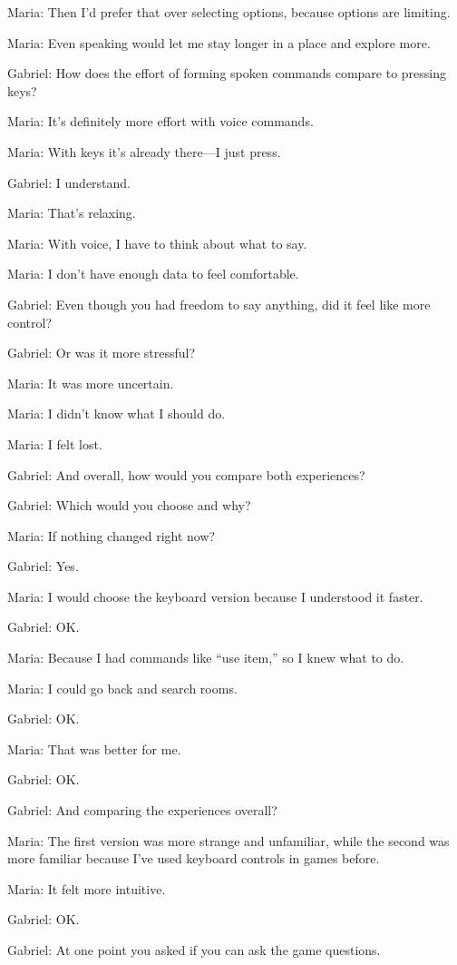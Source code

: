 Maria: Then I’d prefer that over selecting options, because options are limiting.

Maria: Even speaking would let me stay longer in a place and explore more.

Gabriel: How does the effort of forming spoken commands compare to pressing keys?

Maria: It’s definitely more effort with voice commands.

Maria: With keys it’s already there—I just press.

Gabriel: I understand.

Maria: That’s relaxing.

Maria: With voice, I have to think about what to say.

Maria: I don’t have enough data to feel comfortable.

Gabriel: Even though you had freedom to say anything, did it feel like more control?

Gabriel: Or was it more stressful?

Maria: It was more uncertain.

Maria: I didn’t know what I should do.

Maria: I felt lost.

Gabriel: And overall, how would you compare both experiences?

Gabriel: Which would you choose and why?

Maria: If nothing changed right now?

Gabriel: Yes.

Maria: I would choose the keyboard version because I understood it faster.

Gabriel: OK.

Maria: Because I had commands like “use item,” so I knew what to do.

Maria: I could go back and search rooms.

Gabriel: OK.

Maria: That was better for me.

Gabriel: OK.

Gabriel: And comparing the experiences overall?

Maria: The first version was more strange and unfamiliar, while the second was more familiar because I’ve used keyboard controls in games before.

Maria: It felt more intuitive.

Gabriel: OK.

Gabriel: At one point you asked if you can ask the game questions.

